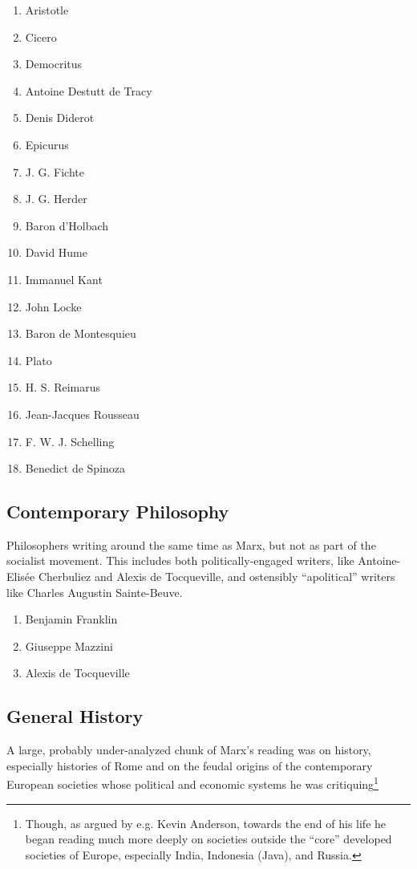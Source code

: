 \begin{enumerate}
    \item Aristotle
    \item Cicero
    \item Democritus
    \item Antoine Destutt de Tracy
    \item Denis Diderot
    \item Epicurus
    \item J. G. Fichte
    \item J. G. Herder
    \item Baron d'Holbach
    \item David Hume
    \item Immanuel Kant
    \item John Locke
    \item Baron de Montesquieu
    \item Plato
    \item H. S. Reimarus
    \item Jean-Jacques Rousseau
    \item F. W. J. Schelling
    \item Benedict de Spinoza
\end{enumerate}

\subsection{Contemporary Philosophy}

Philosophers writing around the same time as Marx, but not as part of the socialist movement. This includes both politically-engaged writers, like Antoine-Elisée Cherbuliez and Alexis de Tocqueville, and ostensibly ``apolitical'' writers like Charles Augustin Sainte-Beuve.

\begin{enumerate}
    \item Benjamin Franklin
    \item Giuseppe Mazzini
    \item Alexis de Tocqueville
\end{enumerate}

\subsection{General History}

A large, probably under-analyzed chunk of Marx's reading was on history, especially histories of Rome and on the feudal origins of the contemporary European societies whose political and economic systems he was critiquing\footnote{Though, as argued by e.g. Kevin Anderson, towards the end of his life he began reading much more deeply on societies outside the ``core'' developed societies of Europe, especially India, Indonesia (Java), and Russia.}

